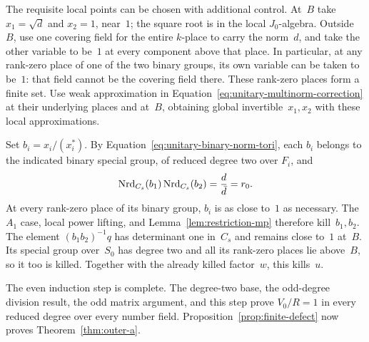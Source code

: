 The requisite local points can be chosen with additional control.
At~$B$ take $x_1=\sqrt d$ and $x_2=1$, near~$1$; the square root is
in the local $J_0$-algebra.  Outside~$B$, use one covering field for
the entire $k$-place to carry the norm~$d$, and take the other
variable to be~$1$ at every component above that place.  In
particular, at any rank-zero place of one of the two binary groups,
its own variable can be taken to be~$1$: that field cannot be the
covering field there.  These rank-zero places form a finite set.
Use weak approximation in
Equation~\eqref{eq:unitary-multinorm-correction} at their underlying
places and at~$B$, obtaining global invertible~$x_1,x_2$ with these
local approximations.

Set $b_i=x_i/(x_i^*)$.  By
Equation~\eqref{eq:unitary-binary-norm-tori}, each $b_i$ belongs to
the indicated binary special group, of reduced degree two over
$F_i$, and
\[
 \operatorname{Nrd}_{C_s}(b_1)\operatorname{Nrd}_{C_s}(b_2)
   =\frac{d}{\bar d}=r_0.
\]
At every rank-zero place of its binary group, $b_i$ is as close to~$1$
as necessary.  The $A_1$ case, local power lifting, and
Lemma~\ref{lem:restriction-mp} therefore kill~$b_1,b_2$.  The element
$(b_1b_2)^{-1}q$ has determinant one in~$C_s$ and remains close to~$1$
at~$B$.  Its special group over~$S_0$ has degree two and all its
rank-zero places lie above~$B$, so it too is killed.  Together with
the already killed factor~$w$, this kills~$u$.

The even induction step is complete.  The degree-two base, the
odd-degree division result, the odd matrix argument, and this step
prove $V_0/R=1$ in every reduced degree over every number field.
Proposition~\ref{prop:finite-defect} now proves
Theorem~\ref{thm:outer-a}.
